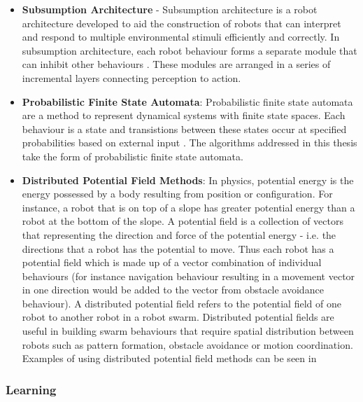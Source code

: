 \begin{itemize}
	\item \textbf{Subsumption Architecture} - Subsumption architecture is a robot architecture developed to aid the construction of robots that can interpret and respond to multiple environmental stimuli efficiently and correctly. In subsumption architecture, each robot behaviour forms a separate module that can inhibit other behaviours \cite{connell1989colony}. These modules are arranged in a series of incremental layers connecting perception to action. 
	
	\item \textbf{Probabilistic Finite State Automata}: Probabilistic finite state automata are a method to represent dynamical systems with finite state spaces. Each behaviour is a state and transistions between these states occur at specified probabilities based on external input \cite{labella2004efficiency, soysal2005probabilistic}. The algorithms addressed in this thesis take the form of probabilistic finite state automata.  
	
	\item \textbf{Distributed Potential Field Methods}: In physics, potential energy is the energy possessed by a body resulting from position or configuration. For instance, a robot that is on top of a slope has greater potential energy than a robot at the bottom of the slope. A potential field is a collection of vectors that representing the direction and force of the potential energy - i.e. the directions that a robot has the potential to move. Thus each robot has a potential field which is made up of a vector combination of individual behaviours (for instance navigation behaviour resulting in a movement vector in one direction would be added to the vector from obstacle avoidance behaviour). A distributed potential field refers to the potential field of one robot to another robot in a robot swarm. Distributed potential fields are useful in building swarm behaviours that require spatial distribution between robots such as pattern formation, obstacle avoidance or motion coordination. Examples of using distributed potential field methods can be seen in \cite{bennet2010distributed, barnes2007unmanned, kim2006decentralized}  
\end{itemize}

\subsubsection{Learning}

